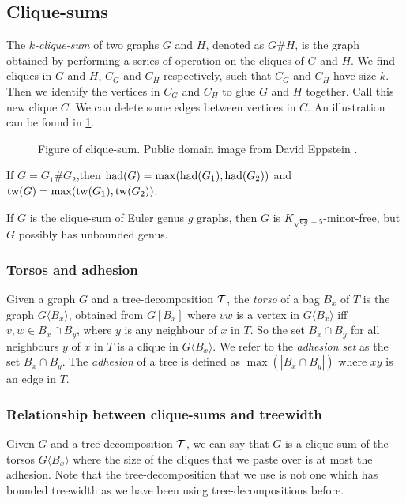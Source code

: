 \subsection{Clique-sums}\label{sssec:Clique_Sums}
The \textit{\(k\)-clique-sum} of two graphs \(G\) and \(H\), denoted as \(G \# H\), is the graph obtained by performing a series of operation on the cliques of \(G\) and \(H\). We find cliques in \(G\) and \(H\), \(C_G\) and \(C_H\) respectively, such that \(C_G\) and \(C_H\) have size \(k\). Then we identify the vertices in \(C_G\) and \(C_H\) to glue \(G\) and \(H\) together. Call this new clique \(C\). We can delete some edges between vertices in \(C\). An illustration can be found in \cref{fig:clique-sum}. 

\begin{figure}[h]
	\centering
	
	\caption{Figure of clique-sum. Public domain image from David Eppstein \cite{eppsteinCliquesum2023}.}
	\label{fig:clique-sum}
\end{figure}


\begin{lemma}
	If \(G = G_1 \# G_2\),then \(\operatorname{had}(G) = \max(\operatorname{had}(G_1), \operatorname{had}(G_2))\) and \(\operatorname{tw}(G) = \max(\operatorname{tw}(G_1), \operatorname{tw}(G_2))\).
\end{lemma}

\begin{example}\label{ex:clique_sum_genus}
	If \(G\) is the clique-sum of Euler genus \(g\) graphs, then \(G\) is \(K_{\sqrt{6g} + 5}\)-minor-free, but \(G\) possibly has unbounded genus.
\end{example}

\subsubsection{Torsos and adhesion}\label{sssec:Torsos and Adhesion}
Given a graph \(G\) and a tree-decomposition \(\mathcal{T}\), the \textit{torso} of a bag \(B_x\) of \(T\) is the graph \(G\langle B_x \rangle\), obtained from \(G[B_x]\) where \(vw\) is a vertex in \(G\langle B_x \rangle\) iff \(v,w \in B_x \cap B_y\), where \(y\) is any neighbour of \(x\) in \(T\). So the set \(B_x \cap B_y\) for all neighbours \(y\) of \(x\) in \(T\) is a clique in \(G\langle B_x \rangle\).
We refer to the \textit{adhesion set} as the set \(B_x \cap B_y\). 
The \textit{adhesion} of a tree is defined as \(\max(|B_x \cap B_y|)\) where \(xy\) is an edge in \(T\).

\subsubsection{Relationship between clique-sums and treewidth}
Given \(G\) and a tree-decomposition \(\mathcal{T}\), we can say that \(G\) is a clique-sum of the torsos \(G\langle B_x \rangle\) where the size of the cliques that we paste over is at most the adhesion. Note that the tree-decomposition that we use is not one which has bounded treewidth as we have been using tree-decompositions before.

